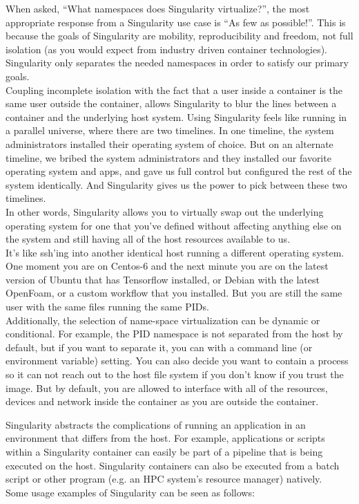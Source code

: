 \documentclass[a4paper]{article}
\newcounter{subsubsubsection}[subsubsection]
\begin{document}
When asked, “What namespaces does Singularity virtualize?”, the most appropriate response from a Singularity use case is “As few as possible!”. This is because the goals of Singularity are mobility, reproducibility and freedom, not full isolation (as you would expect from industry driven container technologies). Singularity only separates the needed namespaces in order to satisfy our primary goals.
\\[0.2in]
Coupling incomplete isolation with the fact that a user inside a container is the same user outside the container, allows Singularity to blur the lines between a container and the underlying host system. Using Singularity feels like running in a parallel universe, where there are two timelines. In one timeline, the system administrators installed their operating system of choice. But on an alternate timeline, we bribed the system administrators and they installed our favorite operating system and apps, and gave us full control but configured the rest of the system identically. And Singularity gives us the power to pick between these two timelines.
\\[0.2in]
In other words, Singularity allows you to virtually swap out the underlying operating system for one that you’ve defined without affecting anything else on the system and still having all of the host resources available to us.
\\[0.2in]
It’s like ssh’ing into another identical host running a different operating system. One moment you are on Centos-6 and the next minute you are on the latest version of Ubuntu that has Tensorflow installed, or Debian with the latest OpenFoam, or a custom workflow that you installed. But you are still the same user with the same files running the same PIDs.
\\[0.2in]
Additionally, the selection of name-space virtualization can be dynamic or conditional. For example, the PID namespace is not separated from the host by default, but if you want to separate it, you can with a command line (or environment variable) setting. You can also decide you want to contain a process so it can not reach out to the host file system if you don’t know if you trust the image. But by default, you are allowed to interface with all of the resources, devices and network inside the container as you are outside the container.
\\


Singularity abstracts the complications of running an application in an environment that differs from the host. For example, applications or scripts within a Singularity container can easily be part of a pipeline that is being executed on the host. Singularity containers can also be executed from a batch script or other program (e.g. an HPC system’s resource manager) natively.
\\[0.2in]
Some usage examples of Singularity can be seen as follows:
\end{document}
